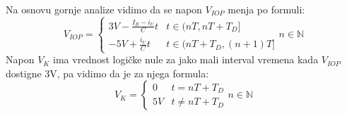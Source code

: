 \documentclass{article}
\begin{document}
                    Na osnovu gornje analize vidimo da se napon $V_{IOP}$ menja po formuli:
                    \begin{equation}
                        \label{VIOP}
                        V_{IOP} = \left\{\begin{array}{ll}
                            3V - \frac{I_R - i_U}{C} t & t \in (nT, nT + T_D] \\
                            -5V + \frac{i_U}{C} t & t \in (nT + T_D, (n+1) T]
                        \end{array}\right.
                        n \in \mathbb{N}
                    \end{equation}
                    Napon $V_K$ ima vrednost logičke nule za jako mali interval vremena kada $V_{IOP}$ dostigne 3V, pa vidimo da je za njega formula:
                    \begin{equation}
                        \label{VK}
                        V_K = \left\{\begin{array}{ll}
                            0 & t = nT + T_D \\
                            5V & t \neq nT + T_D
                        \end{array}\right.
                        n \in \mathbb{N}
                    \end{equation}
\end{document}
